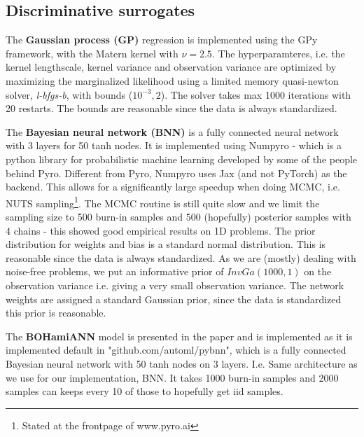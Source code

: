 \subsection{Discriminative surrogates}
The \textbf{Gaussian process (GP)} regression is implemented using the GPy framework, with the
Matern kernel with $\nu=2.5$. The hyperparamteres, i.e. the kernel lengthscale, kernel variance and
observation variance are optimized by maximizing the marginalized likelihood using a limited memory
quasi-newton solver, \textit{l-bfgs-b}, with bounds ($10^{-3}, 2$). The solver takes max 1000
iterations with 20 restarts. The bounds are reasonable since the data is always standardized. 

The \textbf{Bayesian neural network (BNN)} is a fully connected neural network with 3 layers for 50
tanh nodes. It is implemented using Numpyro - which is a python library for probabilistic machine
learning developed by some of the people behind Pyro. Different from Pyro, Numpyro uses Jax (and not
PyTorch) as the backend. This allows for a significantly large speedup when doing MCMC, i.e. NUTS
sampling\footnote{Stated at the frontpage of www.pyro.ai}. The MCMC routine is still quite slow and
we limit the sampling size to 500 burn-in samples and 500 (hopefully) posterior samples with 4
chains - this showed good empirical results on 1D problems. The prior distribution for weights and
bias is a standard normal distribution. This is reasonable since the data is always standardized. As
we are (mostly) dealing with noise-free problems, we put an informative prior of $InvGa(1000,1)$ on
the observation variance i.e. giving a very small observation variance. The network weights are
assigned a standard Gaussian prior, since the data is standardized this prior is reasonable. 

The \textbf{BOHamiANN} model is presented in the paper \cite{BOHAMIANN} and is implemented as it is implemented default
in "github.com/automl/pybnn", which is a fully connected Bayesian neural network with 50 tanh nodes on 3 layers. 
I.e. Same architecture as we use for our implementation, BNN. It takes 1000 burn-in samples and 2000 samples can keeps
every 10 of those to hopefully get iid samples. 

